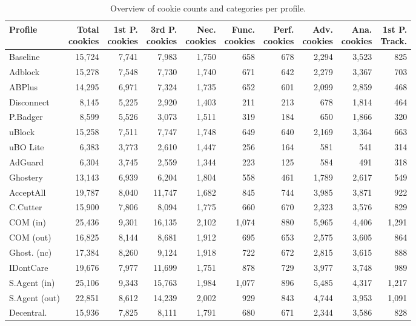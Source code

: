 \begin{table}[t]
\caption{Overview of cookie counts and categories per profile.}
\label{tab:cookie-summary}
\footnotesize
\begin{tabular}{lrrrrrrrrr}
\toprule
\textbf{Profile} & \shortstack{\textbf{Total}\\\textbf{cookies}} & \shortstack{\textbf{1st P.}\\\textbf{cookies}} & \shortstack{\textbf{3rd P.}\\\textbf{cookies}} & \shortstack{\textbf{Nec.}\\\textbf{cookies}} & \shortstack{\textbf{Func.}\\\textbf{cookies}} & \shortstack{\textbf{Perf.}\\\textbf{cookies}} & \shortstack{\textbf{Adv.}\\\textbf{cookies}} & \shortstack{\textbf{Ana.}\\\textbf{cookies}} & \shortstack{\textbf{1st P.}\\\textbf{Track.}} \\
\midrule
Baseline & 15,724 & 7,741 & 7,983 & 1,750 & 658 & 678 & 2,294 & 3,523 & 825 \\
Adblock & 15,278 & 7,548 & 7,730 & 1,740 & 671 & 642 & 2,279 & 3,367 & 703 \\
ABPlus & 14,295 & 6,971 & 7,324 & 1,735 & 652 & 601 & 2,099 & 2,859 & 468 \\
Disconnect & 8,145 & 5,225 & 2,920 & 1,403 & 211 & 213 & 678 & 1,814 & 464 \\
P.Badger & 8,599 & 5,526 & 3,073 & 1,511 & 319 & 184 & 650 & 1,866 & 320 \\
uBlock & 15,258 & 7,511 & 7,747 & 1,748 & 649 & 640 & 2,169 & 3,364 & 663 \\
uBO Lite & 6,383 & 3,773 & 2,610 & 1,447 & 256 & 164 & 581 & 541 & 314 \\
AdGuard & 6,304 & 3,745 & 2,559 & 1,344 & 223 & 125 & 584 & 491 & 318 \\
Ghostery & 13,143 & 6,939 & 6,204 & 1,804 & 558 & 461 & 1,789 & 2,617 & 549 \\
AcceptAll & 19,787 & 8,040 & 11,747 & 1,682 & 845 & 744 & 3,985 & 3,871 & 922 \\
C.Cutter & 15,900 & 7,806 & 8,094 & 1,775 & 660 & 670 & 2,323 & 3,576 & 829 \\
COM (in) & 25,436 & 9,301 & 16,135 & 2,102 & 1,074 & 880 & 5,965 & 4,406 & 1,291 \\
COM (out) & 16,825 & 8,144 & 8,681 & 1,912 & 695 & 653 & 2,575 & 3,605 & 864 \\
Ghost. (nc) & 17,384 & 8,260 & 9,124 & 1,918 & 722 & 672 & 2,815 & 3,615 & 888 \\
IDontCare & 19,676 & 7,977 & 11,699 & 1,751 & 878 & 729 & 3,977 & 3,748 & 989 \\
S.Agent (in) & 25,106 & 9,343 & 15,763 & 1,984 & 1,077 & 896 & 5,485 & 4,317 & 1,217 \\
S.Agent (out) & 22,851 & 8,612 & 14,239 & 2,002 & 929 & 843 & 4,744 & 3,953 & 1,091 \\
Decentral. & 15,936 & 7,825 & 8,111 & 1,791 & 680 & 671 & 2,344 & 3,586 & 828 \\
\bottomrule
\end{tabular}
\end{table}